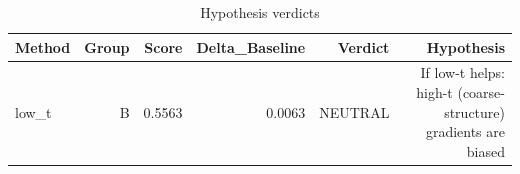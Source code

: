 \begin{table}[htbp]
\centering
\caption{Hypothesis verdicts}
\label{tab:hyp-verdicts}
\begin{tabular}{lrrrrr}
\toprule
\textbf{Method} & \textbf{Group} & \textbf{Score} & \textbf{Delta\_Baseline} & \textbf{Verdict} & \textbf{Hypothesis} \\
\midrule
low\_t & B & 0.5563 & 0.0063 & NEUTRAL & If low-t helps: high-t (coarse-structure) gradients are biased \\
\bottomrule
\end{tabular}
\end{table}
